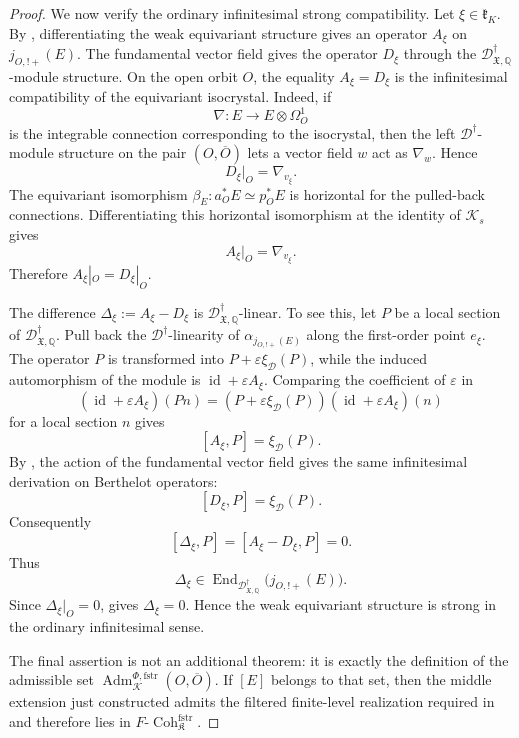 \documentclass[11pt]{amsart}
\theoremstyle{plain}
\theoremstyle{definition}
\theoremstyle{remark}
\newcommand{\Coh}{\operatorname{Coh}}
\newcommand{\fstr}{\mathrm{fstr}}
\newcommand{\Adm}{\operatorname{Adm}}
\begin{document}
\begin{proof}
We now verify the ordinary infinitesimal strong compatibility. Let
\(\xi\in\mathfrak k_K\). By
, differentiating the weak
equivariant structure gives an operator \(A_\xi\) on \(j_{O,!+}(E)\). The
fundamental vector field gives the operator \(D_\xi\) through the
\(\mathscr D^\dagger_{\mathfrak X,\mathbb Q}\)-module structure. On the open
orbit \(O\), the equality \(A_\xi=D_\xi\) is the infinitesimal compatibility of
the equivariant isocrystal. Indeed, if
\[
  \nabla:E\longrightarrow E\otimes\Omega^1_O
\]
is the integrable connection corresponding to the isocrystal, then the
left \(\mathscr D^\dagger\)-module structure on the pair \((O,\overline O)\)
lets a vector field \(w\) act as \(\nabla_w\). Hence
\[
  D_\xi|_O=\nabla_{v_\xi}.
\]
The equivariant isomorphism \(\beta_E:a_O^*E\simeq p_O^*E\) is horizontal for
the pulled-back connections. Differentiating this horizontal isomorphism at the
identity of \(\mathcal K_s\) gives
\[
  A_\xi|_O=\nabla_{v_\xi}.
\]
Therefore \(A_\xi|_O=D_\xi|_O\).

The difference \(\Delta_\xi:=A_\xi-D_\xi\) is
\(\mathscr D^\dagger_{\mathfrak X,\mathbb Q}\)-linear. To see this, let
\(P\) be a local section of \(\mathscr D^\dagger_{\mathfrak X,\mathbb Q}\). Pull
back the \(\mathscr D^\dagger\)-linearity of \(\alpha_{j_{O,!+}(E)}\) along the
first-order point \(e_\xi\). The operator \(P\) is transformed into
\(P+\varepsilon\xi_{\mathscr D}(P)\), while the induced automorphism of the
module is \(\operatorname{id}+\varepsilon A_\xi\). Comparing the coefficient of
\(\varepsilon\) in
\[
  (\operatorname{id}+\varepsilon A_\xi)(P n)
  =(P+\varepsilon\xi_{\mathscr D}(P))
  (\operatorname{id}+\varepsilon A_\xi)(n)
\]
for a local section \(n\) gives
\[
  [A_\xi,P]=\xi_{\mathscr D}(P).
\]
By , the action of the
fundamental vector field gives the same infinitesimal derivation on Berthelot
operators:
\[
  [D_\xi,P]=\xi_{\mathscr D}(P).
\]
Consequently
\begin{equation}
\label{eq:strong-middle-extension-commutator}
  [\Delta_\xi,P]
  =[A_\xi-D_\xi,P]
  =0.
\end{equation}
Thus
\[
  \Delta_\xi\in
  \operatorname{End}_{\mathscr D^\dagger_{\mathfrak X,\mathbb Q}}
  \bigl(j_{O,!+}(E)\bigr).
\]
Since \(\Delta_\xi|_O=0\), 
gives \(\Delta_\xi=0\). Hence the weak equivariant structure is strong in the
ordinary infinitesimal sense.

The final assertion is not an additional theorem: it is exactly the definition
of the admissible set \(\Adm^{\Phi,\fstr}_{\mathcal K}(O,\overline O)\). If
\([E]\) belongs to that set, then the middle extension just constructed admits
the filtered finite-level realization required in
 and therefore lies in
\(F\text{-}\Coh^{\fstr}_{\mathfrak K}\).
\end{proof}
\end{document}
